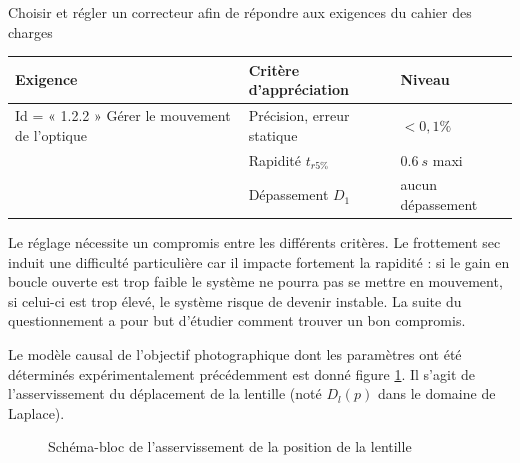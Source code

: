 \begin{obj}
Choisir et régler un correcteur afin de répondre aux exigences du cahier des charges
\end{obj}
\ifprof\else
\begin{center}
\begin{tabular}{|p{}|p{}|p{}|}
\hline 
\textbf{Exigence} & \textbf{Critère d'appréciation} & \textbf{Niveau} \\ 
\hline 
Id = « 1.2.2 » Gérer le mouvement de l'optique & Précision, erreur statique & $<0,1\%$ \\ 
\cline{2-3}
& Rapidité $t_{r5\%}$ & $\SI{0,6}{s}$ maxi \\ 
\cline{2-3}
& Dépassement $D_1$ & aucun dépassement \\ 
\hline 
\end{tabular} 
\end{center}


Le réglage nécessite un compromis
entre les différents critères. Le frottement sec induit une difficulté
particulière car il impacte fortement la rapidité : si le gain en boucle
ouverte est trop faible le système ne pourra pas se mettre en mouvement,
si celui-ci est trop élevé, le système risque de devenir instable. La
suite du questionnement a pour but d'étudier comment trouver un bon
compromis.

Le modèle causal de l'objectif photographique dont les paramètres ont
été déterminés expérimentalement précédemment est donné figure \ref{fig14}. Il s'agit de l'asservissement du déplacement de la lentille (noté $D_l(p)$ dans le domaine de Laplace).

\begin{figure}[!htb]
\begin{center}


\caption{Schéma-bloc de l'asservissement de la position de la lentille \label{fig14}}
\end{center}
\end{figure}
\fi

